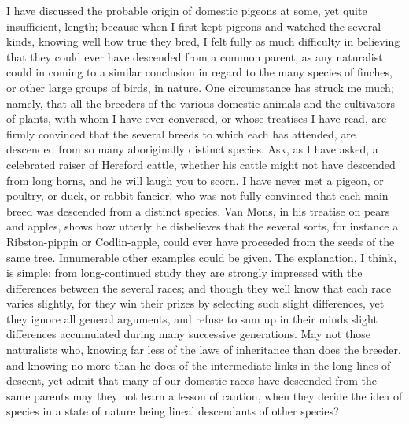 \indent I have discussed the probable origin of domestic pigeons at some, yet quite insufficient, length; because when I first kept pigeons and watched the several kinds, knowing well how true they bred, I felt fully as much difficulty in believing that they could ever have descended from a common parent, as any naturalist could in coming to a similar conclusion in regard to the many species of finches, or other large groups of birds, in nature. One circumstance has struck me much; namely, that all the breeders of the various domestic animals and the cultivators of plants, with whom I have ever conversed, or whose treatises I have read, are firmly convinced that the several breeds to which each has attended, are descended from so many aboriginally distinct species. Ask, as I have asked, a celebrated raiser of Hereford cattle, whether his cattle might not have descended from long horns, and he will laugh you to scorn. I have never met a pigeon, or poultry, or duck, or rabbit fancier, who was not fully convinced that each main breed was descended from a distinct species. Van Mons, in his treatise on pears and apples, shows how utterly he disbelieves that the several sorts, for instance a Ribston-pippin or Codlin-apple, could ever have proceeded from the seeds of the same tree. Innumerable other examples could be given. The explanation, I think, is simple: from long-continued study they are strongly impressed with the differences between the several races; and though they well know that each race varies slightly, for they win their prizes by selecting such slight differences, yet they ignore all general arguments, and refuse to sum up in their minds slight differences accumulated during many successive generations. May not those naturalists who, knowing far less of the laws of inheritance than does the breeder, and knowing no more than he does of the intermediate links in the long lines of descent, yet admit that many of our domestic races have descended from the same parents may they not learn a lesson of caution, when they deride the idea of species in a state of nature being lineal descendants of other species?    \\


